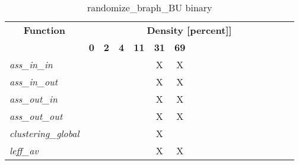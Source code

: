 \begin{table}[h] \centering \begin{tabular}{|l|c|c|c|c|c|c|} \hline\multicolumn{1}{|c|}{\textbf{\large{Function}}} & \multicolumn{17}{c|}{\large{\textbf{Density [percent]]}}}\\\cline{2-18}  & \textbf{0} &  \textbf{2} &  \textbf{4} &  \textbf{11} &  \textbf{31} &  \textbf{69} \\ \hline   \textit{ass\_in\_in} &   &   &   &   & X & X \\ \hline  \textit{ass\_in\_out} &   &   &   &   & X & X \\ \hline  \textit{ass\_out\_in} &   &   &   &   & X & X \\ \hline  \textit{ass\_out\_out} &   &   &   &   & X & X \\ \hline  \textit{clustering\_global} &   &   &   &   & X &   \\ \hline  \textit{leff\_av} &   &   &   &   & X & X \\ \hline \end{tabular}\caption{randomize\_braph\_BU binary}\label{tab:my_label} \end{table}